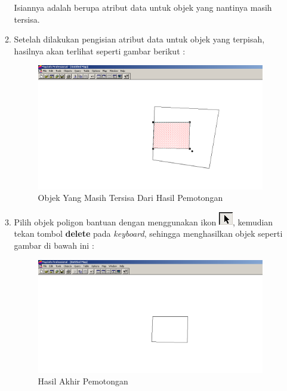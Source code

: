 \begin{enumerate}[\bfseries A.]
\begin{enumerate}[1.]
    Isiannya adalah berupa atribut data untuk objek yang nantinya masih tersisa.
    
    \item Setelah dilakukan pengisian atribut data untuk objek yang terpisah, hasilnya akan terlihat seperti gambar berikut :
    
    \begin{figure}[H]
      \centering
      \includegraphics[width=1\textwidth]{./resources/038-objek-target-terpotong-erase-2}
      \caption{Objek Yang Masih Tersisa Dari Hasil Pemotongan}
    \end{figure}
    
    \item Pilih objek poligon bantuan dengan menggunakan ikon \includegraphics{./resources/008-ikon-select}, kemudian tekan tombol \textbf{delete} pada \textit{keyboard}, sehingga menghasilkan objek seperti gambar di bawah ini :
    
    \begin{figure}[H]
      \centering
      \includegraphics[width=1\textwidth]{./resources/039-hasil-erase-2}
      \caption{Hasil Akhir Pemotongan}
    \end{figure}
  \end{enumerate}
  

\end{enumerate}
